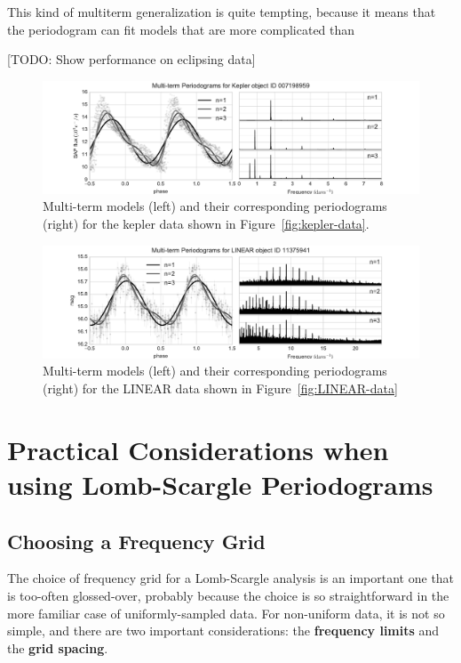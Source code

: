 \documentclass[preprint]{aastex}
\newcommand{\todo}[1]{{\color{red} [TODO: #1]}}
\newcommand{\fig}[1]{Figure~\ref{fig:#1}}
\newcommand{\figlabel}[1]{\label{fig:#1}}
\newcommand{\sectlabel}[1]{\label{sect:#1}}
\begin{document}
This kind of multiterm generalization is quite tempting, because it means that
the periodogram can fit models that are more complicated than 

\todo{Show performance on eclipsing data}


\begin{figure}[ht]
  \centering
  \includegraphics[width=\textwidth]{fig21_kepler_multiterm}
  \caption{Multi-term models (left) and their corresponding periodograms (right)
    for the kepler data shown in \fig{kepler-data}.
    \figlabel{kepler-multiterm}}
\end{figure}

\begin{figure}[ht]
  \centering
  \includegraphics[width=\textwidth]{fig22_LINEAR_multiterm}
  \caption{Multi-term models (left) and their corresponding periodograms (right)
    for the LINEAR data shown in \fig{LINEAR-data}
    \figlabel{LINEAR-multiterm}}
\end{figure}



\section{Practical Considerations when using Lomb-Scargle Periodograms}
\sectlabel{practical-considerations}

\subsection{Choosing a Frequency Grid}
The choice of frequency grid for a Lomb-Scargle analysis is an important one
that is too-often glossed-over, probably because the choice is so
straightforward in the more familiar case of uniformly-sampled data.
For non-uniform data, it is not so simple, and there are two important
considerations: the {\bf frequency limits} and the {\bf grid spacing}.
\end{document}
